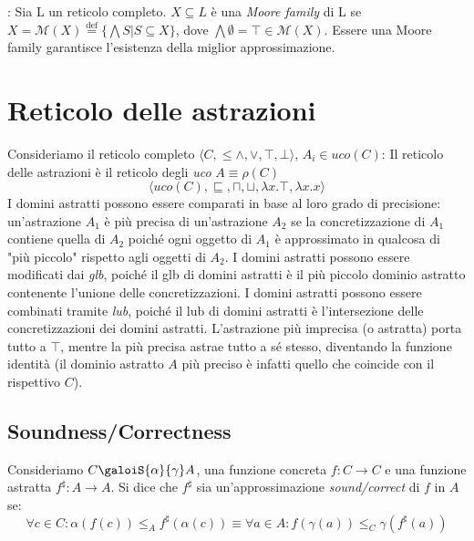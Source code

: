 \documentclass[a4paper, 10pt]{book}
\newcommand{\Mmoore}{\mathcal{M}}
\newenvironment{definition}[1][Definizione]{\begin{trivlist}
\item[\hskip \labelsep {\bfseries #1}]}{\end{trivlist}}
\begin{document}
    \begin{definition}[Moore families] : Sia L un reticolo completo. $X \subseteq L$ è una \emph{Moore family}
        di L se $X = \Mmoore(X) \overset{\mathrm{def}}{=} \{\bigwedge S | S \subseteq X\}$, dove 
        $\bigwedge \emptyset = \top \in \Mmoore(X)$. Essere una Moore family garantisce l'esistenza della
        miglior approssimazione.
    \end{definition}
    
\section{Reticolo delle astrazioni}
Consideriamo il reticolo completo $\langle C, \leq \land, \lor , \top, \bot \rangle$, $A_i \in uco(C)$:
\newline
Il reticolo delle astrazioni è il reticolo degli \emph{uco} $A \equiv \rho(C)$
$$\langle uco(C), \sqsubseteq, \sqcap, \sqcup, \lambda x.\top, \lambda x.x \rangle$$
I domini astratti possono essere comparati in base al loro grado di precisione: un'astrazione $A_1$ è più
precisa di un'astrazione $A_2$ se la concretizzazione di $A_1$ contiene quella di $A_2$ poiché ogni 
oggetto di $A_1$ è approssimato in qualcosa di "più piccolo" rispetto agli oggetti di $A_2$.
\newline
I domini astratti possono essere modificati dai \emph{glb}, poiché il glb di domini astratti è il più
piccolo dominio astratto contenente l'unione delle concretizzazioni.
\newline
I domini astratti possono essere combinati tramite \emph{lub}, poiché il lub di domini astratti è 
l'intersezione delle concretizzazioni dei domini astratti.
\newline
L'astrazione più imprecisa (o astratta) porta tutto a $\top$, mentre la più precisa astrae tutto a sé stesso,
diventando la funzione identità (il dominio astratto $A$ più preciso è infatti quello che coincide con il
rispettivo $C$).

\subsection{Soundness/Correctness}
\begin{definition}[Correctness]
    Consideriamo $C \galoiS{\alpha}{\gamma} A$, una funzione concreta $ f : C \to C$ e una funzione astratta
    $f^\sharp : A \to A$. Si dice che $f^\sharp$ sia un'approssimazione \emph{sound/correct} di $f$ in $A$ se:
    $$\forall c \in C: \alpha(f(c)) \leq_A f^\sharp(\alpha(c)) 
    \equiv 
    \forall a \in A: f(\gamma(a)) \leq_C \gamma(f^\sharp(a))$$
\end{definition}
\end{document}
